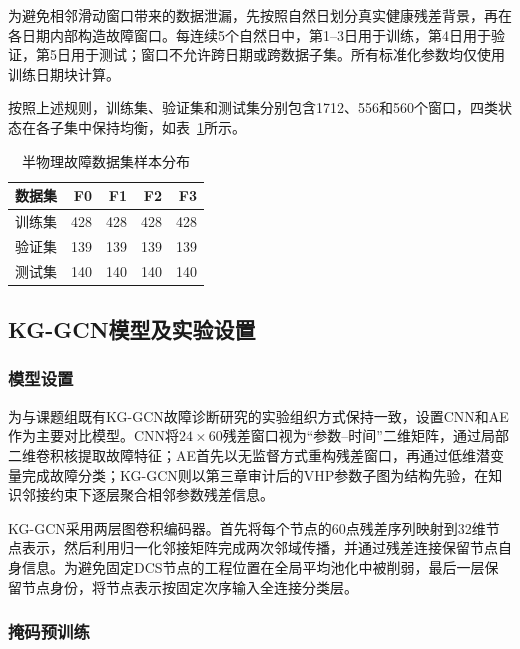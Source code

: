 为避免相邻滑动窗口带来的数据泄漏，先按照自然日划分真实健康残差背景，再在各日期内部构造故障窗口。每连续5个自然日中，第1--3日用于训练，第4日用于验证，第5日用于测试；窗口不允许跨日期或跨数据子集。所有标准化参数均仅使用训练日期块计算。

按照上述规则，训练集、验证集和测试集分别包含1712、556和560个窗口，四类状态在各子集中保持均衡，如表~\ref{tab:fault_dataset_split_v3}所示。

\begin{table}[htbp]
    \centering
    \caption{半物理故障数据集样本分布}
    \label{tab:fault_dataset_split_v3}
    \begin{tabular}{lrrrr}
        \toprule
        数据集 & F0 & F1 & F2 & F3 \\
        \midrule
        训练集 & 428 & 428 & 428 & 428 \\
        验证集 & 139 & 139 & 139 & 139 \\
        测试集 & 140 & 140 & 140 & 140 \\
        \bottomrule
    \end{tabular}
\end{table}

\subsection{KG-GCN模型及实验设置}
\label{subsec:experiment_setting_v3}

\subsubsection{模型设置}

为与课题组既有KG-GCN故障诊断研究的实验组织方式保持一致\cite{YangHaodong2026CFB}，设置CNN和AE作为主要对比模型。CNN将$24\times60$残差窗口视为“参数--时间”二维矩阵，通过局部二维卷积核提取故障特征；AE首先以无监督方式重构残差窗口，再通过低维潜变量完成故障分类；KG-GCN则以第三章审计后的VHP参数子图为结构先验，在知识邻接约束下逐层聚合相邻参数残差信息。

KG-GCN采用两层图卷积编码器。首先将每个节点的60点残差序列映射到32维节点表示，然后利用归一化邻接矩阵完成两次邻域传播，并通过残差连接保留节点自身信息。为避免固定DCS节点的工程位置在全局平均池化中被削弱，最后一层保留节点身份，将节点表示按固定次序输入全连接分类层。

\subsubsection{掩码预训练}

